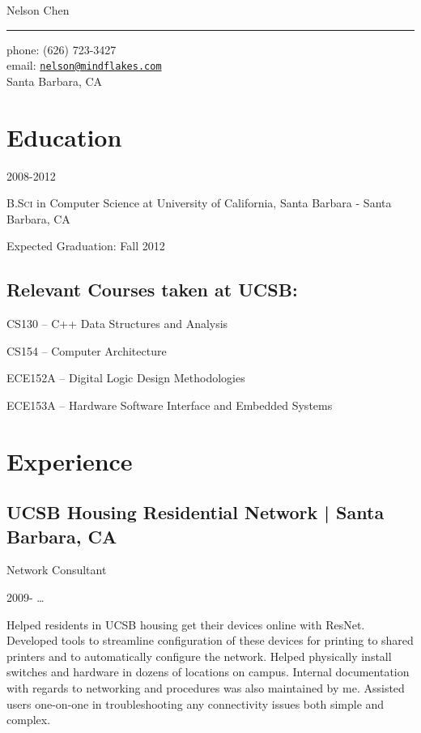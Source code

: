 \documentclass[10pt, letter]{article}
\makeatletter
\def\myname{Nelson Chen}
\def\myemail{nelson@mindflakes.com}
\def\mycellphone{(626) 723-3427}
\def\myaddress{Santa Barbara, CA}
\newcommand{\years}[1]{\marginnote{#1}}
\renewcommand{\years}[1]{#1}
\newenvironment{packed_item}{
\begin{itemize}
  \setlength{\itemsep}{1pt}
  \setlength{\parskip}{0pt}
  \setlength{\parsep}{0pt}
}{\end{itemize}}
\makeatother
\begin{document}
{\LARGE \myname}\\
\hrule
\begin{multicols}{2}
\vspace{0.2in}
{\large phone: \mycellphone}\\[.05cm]
{\large email: \href{mailto:\myemail}{\texttt{\myemail}}}\\[.05cm]
\myaddress

\section*{Education}

\years{2008-2012}

\textsc{B.Sci} in Computer Science at University of California, Santa Barbara - Santa Barbara, CA

Expected Graduation: Fall 2012

\subsection*{Relevant Courses taken at UCSB:}

\begin{packed_item}
    \item CS130 -- C++ Data Structures and Analysis
    \item CS154 -- Computer Architecture
    \item ECE152A -- Digital Logic Design Methodologies
    \item ECE153A -- Hardware Software Interface and Embedded Systems
\end{packed_item}

\section*{Experience}

\subsection*{UCSB Housing Residential Network | {\footnotesize{Santa Barbara, CA}}}

Network Consultant

\years{2009- \ldots} 

Helped residents in UCSB housing get their devices online with ResNet.
Developed tools to streamline configuration of these devices for printing to
shared printers and to automatically configure the network. Helped physically
install switches and hardware in dozens of locations on campus. Internal
documentation with regards to networking and procedures was also maintained by
me. Assisted users one-on-one in troubleshooting any connectivity issues both
simple and complex.


\end{multicols}
\end{document}

